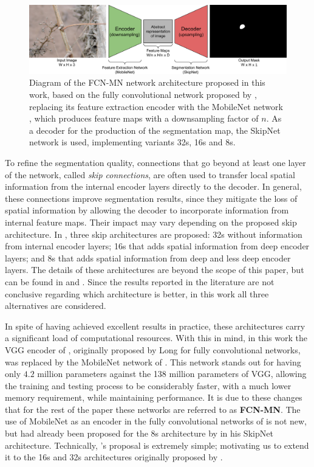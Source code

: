 \documentclass[a4paper,authoryear,review]{elsarticle}
\begin{document}
\begin{figure}
    \centering
    \includegraphics[width=12cm]{figures/Figure1.png}
    \caption{
Diagram of the FCN-MN network architecture proposed in this work, based on the fully convolutional network proposed by \citet{shelhamer2017fully}, replacing its feature extraction encoder with the MobileNet network \citet{howard2017mobilenets}, which produces feature maps with a downsampling factor of $n$. As a decoder for the production of the segmentation map, the SkipNet network \citet{siam2018rtseg} is used, implementing variants 32s, 16s and 8s.
    }
    \label{fig:Figure1}
\end{figure}

To refine the segmentation quality, connections that go beyond at least one layer of the network, called \emph{skip connections}, are often used to transfer local spatial information from the internal encoder layers directly to the decoder. In general, these connections improve segmentation results, since they mitigate the loss of spatial information by allowing the decoder to incorporate information from internal feature maps. Their impact may vary depending on the proposed skip architecture. In \citet{long2015fully}, three skip architectures are proposed: 32s without information from internal encoder layers; 16s that adds spatial information from deep encoder layers; and 8s that adds spatial information from deep and less deep encoder layers. The details of these architectures are beyond the scope of this paper, but can be found in \citet{long2015fully} and \citet{shelhamer2017fully}. Since the results reported in the literature are not conclusive regarding which architecture is better, in this work all three alternatives are considered.

In spite of having achieved excellent results in practice, these architectures carry a significant load of computational resources. With this in mind, in this work the VGG encoder of \citet{Simonyan2015VeryDC}, originally proposed by Long for fully convolutional networks, was replaced by the MobileNet network of \citet{howard2017mobilenets}. This network stands out for having only $4.2$ million parameters against the 138 million parameters of VGG, allowing the training and testing process to be considerably faster, with a much lower memory requirement, while maintaining performance. It is due to these changes that for the rest of the paper these networks are referred to as \textbf{FCN-MN}. The use of MobileNet as an encoder in the fully convolutional networks of \citet{long2015fully} is not new, but had already been proposed for the 8s architecture by \citet{siam2018rtseg} in his SkipNet architecture. Technically, \citet{siam2018rtseg}’s proposal is extremely simple; motivating us to extend it to the 16s and 32s architectures originally proposed by \citep{long2015fully}. 
\end{document}
